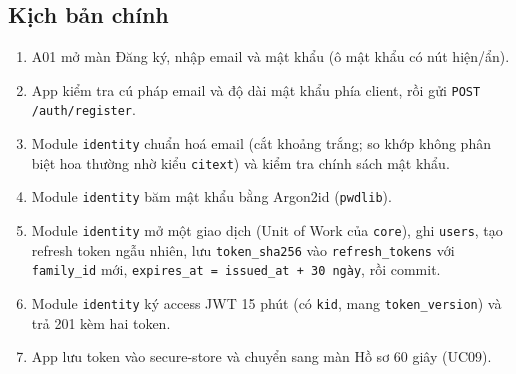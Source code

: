 \subsection{Kịch bản chính}
\begin{enumerate}
\item A01 mở màn Đăng ký, nhập email và mật khẩu (ô mật khẩu có nút hiện/\allowbreak{}ẩn).
\item App kiểm tra cú pháp email và độ dài mật khẩu phía client, rồi gửi {\small\texttt{POST /\allowbreak{}\allowbreak{}auth/\allowbreak{}\allowbreak{}register}}.
\item Module {\small\texttt{identity}} chuẩn hoá email (cắt khoảng trắng; so khớp không phân biệt hoa thường nhờ kiểu {\small\texttt{citext}}) và kiểm tra chính sách mật khẩu.
\item Module {\small\texttt{identity}} băm mật khẩu bằng Argon2id ({\small\texttt{pwdlib}}).
\item Module {\small\texttt{identity}} mở một giao dịch (Unit of Work của {\small\texttt{core}}), ghi {\small\texttt{users}}, tạo refresh token ngẫu nhiên, lưu {\small\texttt{token\_\allowbreak{}\allowbreak{}sha256}} vào {\small\texttt{refresh\_\allowbreak{}\allowbreak{}tokens}} với {\small\texttt{family\_\allowbreak{}\allowbreak{}id}} mới, {\small\texttt{expires\_\allowbreak{}\allowbreak{}at = issued\_\allowbreak{}\allowbreak{}at + 30 ngày}}, rồi commit.
\item Module {\small\texttt{identity}} ký access JWT 15 phút (có {\small\texttt{kid}}, mang {\small\texttt{token\_\allowbreak{}\allowbreak{}version}}) và trả 201 kèm hai token.
\item App lưu token vào secure-\allowbreak{}store và chuyển sang màn Hồ sơ 60 giây (UC09).
\end{enumerate}
